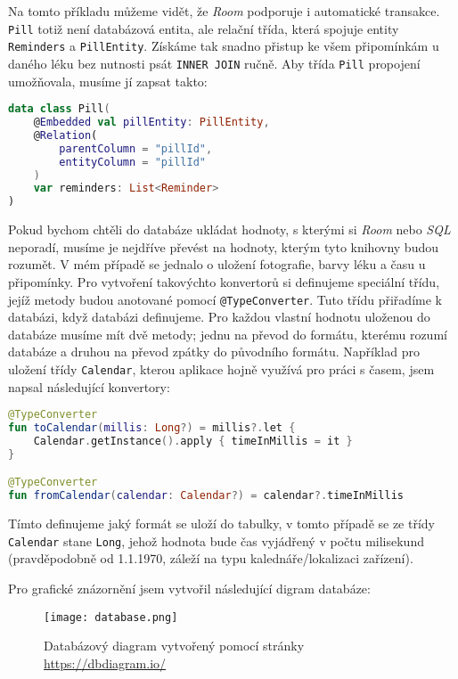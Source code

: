 \documentclass[../TakeYourPill.tex]{subfiles}
\begin{document}
Na tomto příkladu můžeme vidět, že \textit{Room} podporuje i automatické transakce. \texttt{Pill} totiž není databázová entita, ale relační třída, která spojuje entity \texttt{Reminders} a \texttt{PillEntity}. Získáme tak snadno přistup ke všem připomínkám u daného léku bez nutnosti psát \texttt{INNER JOIN} ručně. Aby třída \texttt{Pill} propojení umožňovala, musíme jí zapsat takto:

\setmonofont{JetBrains Mono}
\begin{lstlisting}[language=Kotlin]
data class Pill(
    @Embedded val pillEntity: PillEntity,
    @Relation(
        parentColumn = "pillId",
        entityColumn = "pillId"
    )
    var reminders: List<Reminder>
)
\end{lstlisting}
\setmonofont{Latin Modern Mono}

Pokud bychom chtěli do databáze ukládat hodnoty, s kterými si \textit{Room} nebo \textit{SQL} neporadí, musíme je nejdříve převést na hodnoty, kterým tyto knihovny budou rozumět. V mém případě se jednalo o uložení fotografie, barvy léku a času u připomínky. Pro vytvoření takovýchto konvertorů si definujeme speciální třídu, jejíž metody budou anotované pomocí \texttt{@TypeConverter}. Tuto třídu přiřadíme k databázi, když databázi definujeme. Pro každou vlastní hodnotu uloženou do databáze musíme mít dvě metody; jednu na převod do formátu, kterému rozumí databáze a druhou na převod zpátky do původního formátu. Například pro uložení třídy \texttt{Calendar}, kterou aplikace hojně využívá pro práci s časem, jsem napsal následující konvertory:

\begin{minipage}{\linewidth}
\setmonofont{JetBrains Mono}
\begin{lstlisting}[language=Kotlin]
@TypeConverter
fun toCalendar(millis: Long?) = millis?.let {
    Calendar.getInstance().apply { timeInMillis = it }
}

@TypeConverter
fun fromCalendar(calendar: Calendar?) = calendar?.timeInMillis
\end{lstlisting}
\setmonofont{Latin Modern Mono}
\end{minipage}

Tímto definujeme jaký formát se uloží do tabulky, v tomto případě se ze třídy \texttt{Calendar} stane \texttt{Long}, jehož hodnota bude čas vyjádřený v počtu milisekund (pravděpodobně od 1.1.1970, záleží na typu kalednáře/lokalizaci zařízení). 

Pro grafické znázornění jsem vytvořil následující digram databáze:

\begin{figure}[h]
\centering
\texttt{[image: database.png]}
\caption{Databázový diagram vytvořený pomocí stránky \url{https://dbdiagram.io/}}
\end{figure}
\end{document}
